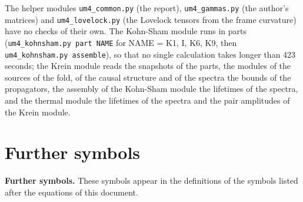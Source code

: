 \documentclass[
  10pt,
]{article}
\begin{document}
The helper modules \texttt{um4\_common.py} (the report),
\texttt{um4\_gammas.py} (the author's matrices) and
\texttt{um4\_lovelock.py} (the Lovelock tensors from the frame
curvature) have no checks of their own. The Kohn-Sham module runs in
parts (\texttt{um4\_kohnsham.py\ part\ NAME} for NAME = K1, I, K6, K9,
then \texttt{um4\_kohnsham.py\ assemble}), so that no single calculation
takes longer than 423 seconds; the Krein module reads the snapshots of
the parts, the modules of the sources of the fold, of the causal
structure and of the spectra the bounds of the propagators, the assembly
of the Kohn-Sham module the lifetimes of the spectra, and the thermal
module the lifetimes of the spectra and the pair amplitudes of the Krein
module.

\hypertarget{further-symbols}{%
\section{Further symbols}\label{further-symbols}}

\textbf{Further symbols.} These symbols appear in the definitions of the
symbols listed after the equations of this document.
\end{document}
